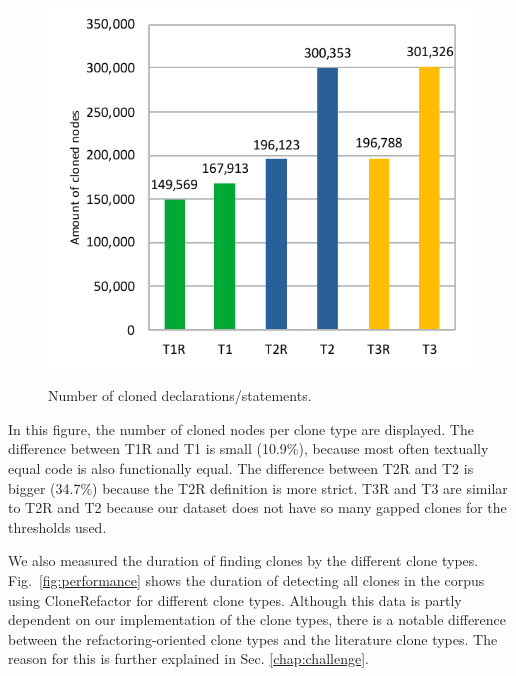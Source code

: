 \documentclass[a4paper]{article}
\begin{document}
\begin{figure}[H]
  \caption{Number of cloned declarations/statements.}
    \includegraphics[width=1\columnwidth]{img/TypeResults}
  \label{fig:typeres}
\end{figure}

In this figure, the number of cloned nodes per clone type are displayed. The difference between T1R and T1 is small (10.9\%), because most often textually equal code is also functionally equal. The difference between T2R and T2 is bigger (34.7\%) because the T2R definition is more strict. T3R and T3 are similar to T2R and T2 because our dataset does not have so many gapped clones for the thresholds used.

We also measured the duration of finding clones by the different clone types. Fig.~\ref{fig:performance} shows the duration of detecting all clones in the corpus using CloneRefactor for different clone types. Although this data is partly dependent on our implementation of the clone types, there is a notable difference between the refactoring-oriented clone types and the literature clone types. The reason for this is further explained in Sec. \ref{chap:challenge}.
\end{document}
